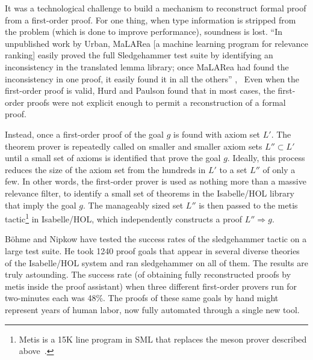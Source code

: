 \documentclass{llncs}
\begin{document}
It was a technological challenge to build a mechanism to reconstruct
formal proof from a first-order proof.  For one thing, when type
information is stripped from the problem (which is done to improve
performance), soundness is lost.  ``In unpublished work by Urban,
MaLARea [a machine learning program for relevance ranking] easily
proved the full Sledgehammer test suite by identifying an
inconsistency in the translated lemma library; once MaLARea had found
the inconsistency in one proof, it easily found it in all the
others'' \cite{Paar},~\cite{UrM} 
Even when the first-order proof is valid, Hurd and Paulson found that
in most cases, the first-order proofs were not explicit enough to permit a
reconstruction of
a formal proof.

Instead, once a first-order proof of the goal $g$ is found with axiom
set $L'$.  The theorem prover is repeatedly called on smaller and
smaller axiom sets $L''\subset L'$ until a small set of axioms is
identified that prove the goal $g$.  Ideally, this process reduces the
size of the axiom set from the hundreds in $L'$ to a set $L''$ of only
a few.  In other words, the first-order prover is used as nothing more
than a massive relevance filter, to identify a small set of theorems
in the Isabelle/HOL library that imply the goal $g$.  The manageably
sized set $L''$ is then passed to the metis tactic\footnote{Metis is a
  15K line program in SML that replaces the meson prover described
  above~\cite{Metis}.} in Isabelle/HOL, which independently constructs a proof
$L''\Longrightarrow g$.  


B\"ohme and Nipkow \cite{Boehme-Nipkow-IJCAR10} have tested the success rates of the
sledgehammer tactic on a large test suite.  He took 1240 proof goals
that appear in several diverse theories of the Isabelle/HOL system and
ran sledgehammer on all of them. The results are truly
astounding. The success rate (of obtaining fully reconstructed proofs
by metis inside the proof assistant) when three different first-order
provers run for two-minutes each was 48\%.  The proofs of these same
goals by hand might represent years of human labor, now fully
automated through a single new tool.
\end{document}
